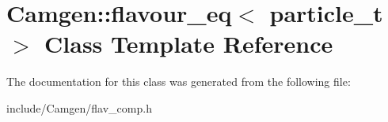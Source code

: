 \hypertarget{a00227}{\section{Camgen\-:\-:flavour\-\_\-eq$<$ particle\-\_\-t $>$ Class Template Reference}
\label{a00227}
}


The documentation for this class was generated from the following file\-:\begin{DoxyCompactItemize}
\item 
include/\-Camgen/flav\-\_\-comp.\-h\end{DoxyCompactItemize}
